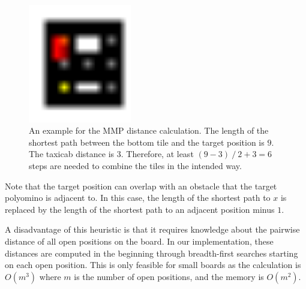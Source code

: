 \begin{figure}
\centering
\includegraphics[width=0.4\textwidth]{figures/distance.pdf}
\caption[Example for MMP distance]{An example for the MMP distance calculation. The length of the shortest path between the bottom tile and the target position is $9$. The taxicab distance is $3$. Therefore, at least $(9 - 3) \mathbin{/} 2 + 3 = 6$ steps are needed to combine the tiles in the intended way.}
\label{fig:distance}
\end{figure}

Note that the target position can overlap with an obstacle that the target polyomino is adjacent to. In this case, the length of the shortest path to $x$ is replaced by the length of the shortest path to an adjacent position minus $1$. \par
A disadvantage of this heuristic is that it requires knowledge about the pairwise distance of all open positions on the board. In our implementation, these distances are computed in the beginning through breadth-first searches starting on each open position. This is only feasible for small boards as the calculation is $O(m^3)$ where $m$ is the number of open positions, and the memory is $O(m^2)$.

